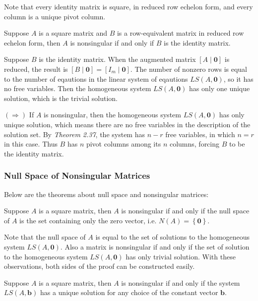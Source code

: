 \documentclass[a4paper,12pt]{article}
\begin{document}
Note that every identity matrix is square, in reduced row echelon form, and every column is a unique pivot column.\n

\begin{thm}
  Suppose $A$ is a square matrix and $B$ is a row-equivalent matrix in reduced row echelon form, then $A$ is nonsingular if and only if $B$ is the identity matrix.\n

  \prf {\color{zr}$\mathit{(\Leftarrow)}$} Suppose $B$ is the identity matrix. When the augmented matrix $[A\!\mid\!\mathbf{0}]$ is reduced, the result is $[B\!\mid\!\mathbf{0}]=[I_{m}\!\mid\!\mathbf{0}]$. The number of nonzero rows is equal to the number of eqautions in the linear system of eqautions $LS(A,\mathbf{0})$, so it has no free variables. Then the homogeneous system $LS(A,\mathbf{0})$ has only one unique solution, which is the trivial solution.\n

  {\color{zr}$\mathit{(\Rightarrow)}$} If $A$ is nonsingular, then the homogeneous system $LS(A,\mathbf{0})$ has only unique solution, which means there are no free variables in the description of the solution set. By {\color{zr}\textit{Theorem 2.37}}, the system has $n-r$ free variables, in which $n=r$ in this case. Thus $B$ has $n$ pivot columns among its $n$ columns, forcing $B$ to be the identity matrix.
\end{thm}

\subsubsection{Null Space of Nonsingular Matrices}
Below are the theorems about null space and nonsingular matrices:

\begin{thm}
  Suppose $A$ is a square matrix, then $A$ is nonsingular if and only if the null space of $A$ is the set containing only the zero vector, i.e. $N(A)=\left\{ \mathbf{0}\right\}$.\n

  \prf Note that the null space of $A$ is equal to the set of solutions to the homogeneous system $LS(A,\mathbf{0})$. Also a matrix is nonsingular if and only if the set of solution to the homogeneous system $LS(A,\mathbf{0})$ has only trivial solution. With these observations, both sides of the proof can be constructed easily.
\end{thm}\n

\begin{thm}
  Suppose $A$ is a square matrix, then $A$ is nonsingular if and only if the system $LS(A,\mathbf{b})$ has a unique solution for any choice of the constant vector $\mathbf{b}$.
\end{thm}\n
\end{document}
